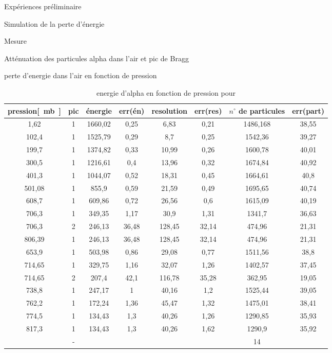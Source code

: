 \documentclass[a4paper,11pt]{scrartcl}
\begin{document}
\begin{section}{Expériences préliminaire}
  \begin{subsection}{Simulation de la perte d'énergie}
  \end{subsection}
 \end{section}

 \begin{section}{Mesure}
  
 \end{section}
\begin{section}{Atténuation des particules alpha dans l'air et pic de Bragg}
\begin{subsection}{perte d'energie dans l'air en fonction de pression}
\begin{table}[htbp]
\caption{energie d'alpha en fonction de pression pour }
\begin{center}
\begin{tabular}{|c||c|c|c|c|c|c|c|}
\hline 
pression\unit{[mb]} & pic	&	énergie	&	err(én)	&	resolution	&	err(res)	&	$n^{\circ}$ de particules	&	err(part) 	\\ \hline\hline
1,62	&	1	&	1660,02	&	0,25	&	6,83	&	0,21	&	1486,168	&	38,55	\\ \hline
102,4	&	1	&	1525,79	&	0,29	&	8,7	&	0,25	&	1542,36	&	39,27	\\ \hline
199,7	&	1	&	1374,82	&	0,33	&	10,99	&	0,26	&	1600,78	&	40,01	\\ \hline
300,5	&	1	&	1216,61	&	0,4	&	13,96	&	0,32	&	1674,84	&	40,92	\\ \hline
401,3	&	1	&	1044,07	&	0,52	&	18,31	&	0,45	&	1664,61	&	40,8	\\ \hline
501,08	&	1	&	855,9	&	0,59	&	21,59	&	0,49	&	1695,65	&	40,74	\\ \hline
608,7	&	1	&	609,86	&	0,72	&	26,56	&	0,6	&	1615,09	&	40,19	\\ \hline
706,3	&	1	&	349,35	&	1,17	&	30,9	&	1,31	&	1341,7	&	36,63	\\ \hline
706,3	&	2	&	246,13	&	36,48	&	128,45	&	32,14	&	474,96	&	21,31	\\ \hline
806,39	&	1	&	246,13	&	36,48	&	128,45	&	32,14	&	474,96	&	21,31	\\ \hline
653,9	&	1	&	503,98	&	0,86	&	29,08	&	0,77	&	1511,56	&	38,8	\\ \hline
714,65	&	1	&	329,75	&	1,16	&	32,07	&	1,26	&	1402,57	&	37,45	\\ \hline
714,65	&	2	&	207,4	&	42,1	&	116,78	&	35,28	&	362,95	&	19,05	\\ \hline
738,8	&	1	&	247,17	&	1	&	40,16	&	1,2	&	1525,44	&	39,05	\\ \hline
762,2	&	1	&	172,24	&	1,36	&	45,47	&	1,32	&	1475,01	&	38,41	\\ \hline
774,5	&	1	&	134,43	&	1,3	&	40,26	&	1,26	&	1290,85	&	35,93	\\ \hline
817,3	&	1	&	134,43	&	1,3	&	40,26	&	1,62	&	1290,9	&	35,92	\\ \hline
	&	-	&		&		&		&		&	14	&		\\ \hline\hline


\end{tabular}
\end{center}
\end{table}
\end{subsection}
\end{section}
\end{document}
